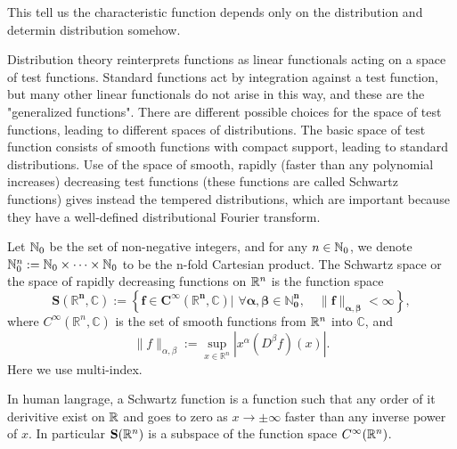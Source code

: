 This tell us the characteristic function depends only on the distribution and determin distribution somehow. 

Distribution theory reinterprets functions as linear functionals acting on a space of test functions. 
Standard functions act by integration against a test function, but many other linear functionals do not arise in this way, and these are the "generalized functions". 
There are different possible choices for the space of test functions, leading to different spaces of distributions. 
The basic space of test function consists of smooth functions with compact support, leading to standard distributions. 
Use of the space of smooth, rapidly (faster than any polynomial increases) decreasing test functions (these functions are called Schwartz functions) gives instead the tempered distributions, which are important because they have a well-defined distributional Fourier transform.

\begin{definition}
    Let $\mathbb{N}_0$ be the set of non-negative integers, and for any $n\in \mathbb{N}_0$, we denote $\mathbb{N}_0^n := \mathbb{N}_0\times \cdots \times \mathbb{N}_0$ to be the n-fold Cartesian product. 
    The Schwartz space or the space of rapidly decreasing functions on $\mathbb{R}^n$ is the function space 
    \begin{equation*}
        \mathbf{S\left({\mathbb {R}}^{n},{\mathbb {C}}\right):=\left\{f\in C^{\infty }({\mathbb {R}}^{n},{\mathbb {C}})|\,\,\forall \alpha ,\beta \in \mathbb {N} _{0}^{n},\quad \|f\|_{\alpha ,\beta }<\infty \right\},}
    \end{equation*}
    where $C^{\infty }({\mathbb {R}}^{n},{\mathbb {C}})$ is the set of smooth functions from $\mathbb{R}^n$ into $\mathbb C$, and 
    \begin{equation*}
        \displaystyle \|f\|_{\alpha ,\beta }:=\sup _{x\in {\mathbb {R}}^{n}}\left|x^{\alpha }(D^{\beta }f)(x)\right|.
    \end{equation*}
    Here we use multi-index.
\end{definition}

In human langrage, a Schwartz function is a function such that any order of it derivitive exist on $\mathbb{R}$ and goes to zero as $x\to \pm \infty$ faster than any inverse power of $x$. 
In particular $\mathbf S(\mathbb{R}^n)$ is a subspace of the function space $C^\infty(\mathbb{R}^n)$.


